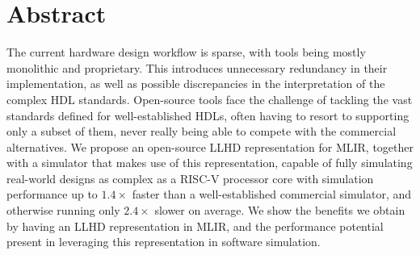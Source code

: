 


\begingroup
\let\clearpage\relax
\let\cleardoublepage\relax
\let\cleardoublepage\relax

\chapter*{Abstract}
The current hardware design workflow is sparse, with tools being mostly monolithic and proprietary. This introduces unnecessary redundancy in their implementation, as well as possible discrepancies in the interpretation of the complex HDL standards.
Open-source tools face the challenge of tackling the vast standards defined for well-established HDLs, often having to resort to supporting only a subset of them, never really being able to compete with the commercial alternatives.
We propose an open-source LLHD representation for MLIR, together with a simulator that makes use of this representation, capable of fully simulating real-world designs as complex as a RISC-V processor core with simulation performance up to $1.4\times$ faster than a well-established commercial simulator, and otherwise running only $2.4\times$ slower on average.
We show the benefits we obtain by having an LLHD representation in MLIR, and the performance potential present in leveraging this representation in software simulation.

\endgroup

\vfill